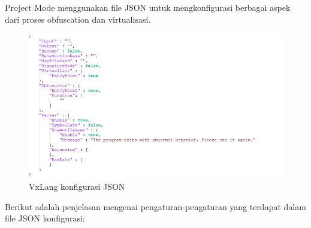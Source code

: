Project Mode menggunakan file JSON untuk mengkonfigurasi berbagai aspek dari proses obfuscation dan virtualisasi.
\begin{figure}
	\centering
	\includegraphics[width=0.55\textheight]
	{assets/pics/vxlang_json.png}
	\caption{VxLang konfigurasi JSON \cite{VxLang}}
\end{figure}
Berikut adalah penjelasan mengenai pengaturan-pengaturan yang terdapat dalam file JSON konfigurasi:
